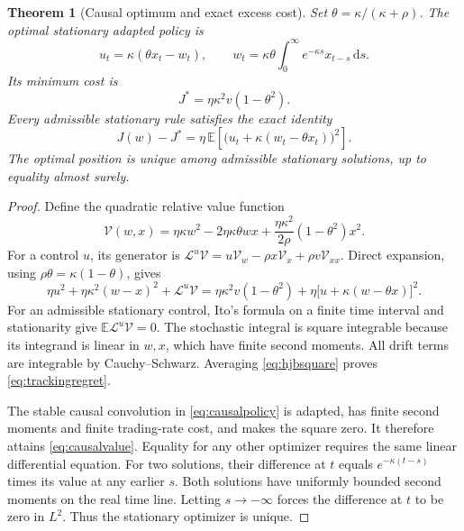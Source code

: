\documentclass[11pt]{article}
\theoremstyle{plain}
\newtheorem{theorem}{Theorem}[section]
\theoremstyle{definition}
\theoremstyle{remark}
\newcommand{\E}{\mathbb E}
\newcommand{\dd}{\,\mathrm d}
\begin{document}
\begin{theorem}[Causal optimum and exact excess cost]\label{thm:causal}
Set \(\theta=\kappa/(\kappa+\rho)\).
The optimal stationary adapted policy is
\begin{equation}\label{eq:causalpolicy}
u_t=\kappa(\theta x_t-w_t),\qquad
w_t=\kappa\theta\int_0^\infty e^{-\kappa s}x_{t-s}\dd s .
\end{equation}
Its minimum cost is
\begin{equation}\label{eq:causalvalue}
J^\ast=\eta\kappa^2v(1-\theta^2).
\end{equation}
Every admissible stationary rule satisfies the exact identity
\begin{equation}\label{eq:trackingregret}
J(w)-J^\ast
=\eta\,\E\!\left[\big(u_t+\kappa(w_t-\theta x_t)\big)^2\right].
\end{equation}
The optimal position is unique among admissible stationary solutions,
up to equality almost surely.
\end{theorem}
\begin{proof}
Define the quadratic relative value function
\[
\mathcal V(w,x)=
\eta\kappa w^2-2\eta\kappa\theta wx
 +\frac{\eta\kappa^2}{2\rho}(1-\theta^2)x^2.
\]
For a control \(u\), its generator is
\(\mathcal L^u\mathcal V
=u\mathcal V_w-\rho x\mathcal V_x+\rho v\mathcal V_{xx}\).
Direct expansion, using \(\rho\theta=\kappa(1-\theta)\), gives
\begin{equation}\label{eq:hjbsquare}
\eta u^2+\eta\kappa^2(w-x)^2+\mathcal L^u\mathcal V
=\eta\kappa^2v(1-\theta^2)
 +\eta\big[u+\kappa(w-\theta x)\big]^2.
\end{equation}
For an admissible stationary control, Ito's formula on a finite time
interval and stationarity give \(\E\mathcal L^u\mathcal V=0\).
The stochastic integral is square integrable because its integrand is
linear in \(w,x\), which have finite second moments. All drift terms are
integrable by Cauchy--Schwarz. Averaging \eqref{eq:hjbsquare} proves
\eqref{eq:trackingregret}.

The stable causal convolution in \eqref{eq:causalpolicy} is adapted,
has finite second moments and finite trading-rate cost, and makes the
square zero. It therefore attains \eqref{eq:causalvalue}.
Equality for any other optimizer requires the same linear differential
equation. For two solutions, their difference at \(t\) equals
\(e^{-\kappa(t-s)}\) times its value at any earlier \(s\).
Both solutions have uniformly bounded second moments on the real time
line. Letting \(s\to-\infty\) forces the difference at \(t\) to be
zero in \(L^2\). Thus the stationary optimizer is unique.
\end{proof}
\end{document}
